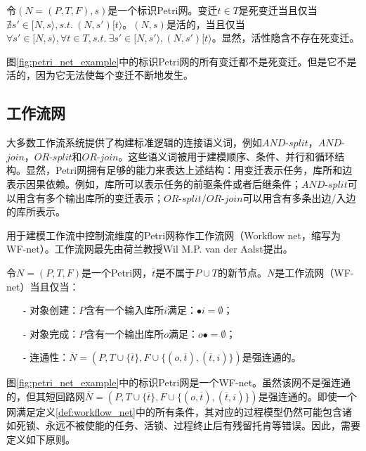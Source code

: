 \begin{definition}[死变迁，活性]\label{def:dead_transition}
令$(N=(P,T,F),s)$是一个标识Petri网。变迁$t\in T$是死变迁当且仅当$\nexists s'\in[N,s\rangle,s.t.~(N,s')[t\rangle$。$(N,s)$是活的，当且仅当$\forall s'\in[N,s\rangle,\forall t\in T,s.t.~\exists s'\in[N,s'\rangle,(N,s')[t\rangle$。显然，活性隐含不存在死变迁。
\end{definition}

图\ref{fig:petri_net_example}中的标识Petri网的所有变迁都不是死变迁。但是它不是活的，因为它无法使每个变迁不断地发生。

\subsection{工作流网}\label{subsec:workflow_net}
大多数工作流系统提供了构建标准逻辑的连接语义词，例如$AND$-$split$，$AND$-$join$，$OR$-$split$和$OR$-$join$\cite{van2004workflowbook,fischer2002workflow,jablonski1996workflow,leymann2000production}。这些语义词被用于建模顺序、条件、并行和循环结构\cite{fischer2002workflow}。显然，Petri网拥有足够的能力来表达上述结构：用变迁表示任务，库所和边表示因果依赖。例如，库所可以表示任务的前驱条件或者后继条件；$AND$-$split$可以用含有多个输出库所的变迁表示；$OR$-$split$/$OR$-$join$可以用含有多条出边/入边的库所表示。

用于建模工作流中控制流维度的Petri网称作工作流网（Workflow net，缩写为WF-net）。工作流网最先由荷兰教授Wil M.P. van der Aalst提出\cite{van1998application}。

\begin{definition}[工作流网]\label{def:workflow_net}
令$N=(P,T,F)$是一个Petri网，$\overline{t}$是不属于$P\cup T$的新节点。$N$是工作流网（WF-net）当且仅当：
  \begin{itemize}
  	\item[-] 对象创建：$P$含有一个输入库所$i$满足：$\bullet i=\emptyset$；
  	\item[-] 对象完成：$P$含有一个输出库所$o$满足：$o\bullet=\emptyset$；
  	\item[-] 连通性：$\overline{N}=(P,T\cup\{\overline{t}\},F\cup\{(o,\overline{t}),(\overline{t},i)\})$是强连通的。
  \end{itemize}
\end{definition}

图\ref{fig:petri_net_example}中的标识Petri网是一个WF-net。虽然该网不是强连通的，但其短回路网$\overline{N}=(P,T\cup\{\overline{t}\},F\cup\{(o,\overline{t}),(\overline{t},i)\})$是强连通的。即使一个网满足定义\ref{def:workflow_net}中的所有条件，其对应的过程模型仍然可能包含诸如死锁、永远不被使能的任务、活锁、过程终止后有残留托肯等错误。因此，需要定义如下原则。

